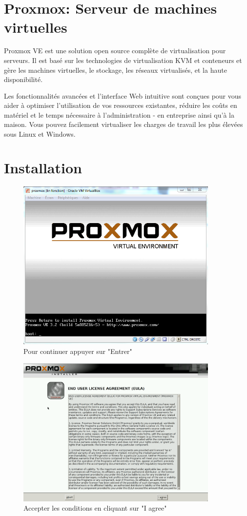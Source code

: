 \documentclass[12pt,a4paper]{article}
\begin{document}
\newpage
\section{Proxmox: Serveur de machines virtuelles}

Proxmox VE est une solution open source complète de virtualisation pour serveurs. Il est basé sur les technologies de virtualisation KVM et conteneurs et gère les machines virtuelles, le stockage, les réseaux virtualisés, et la haute disponibilité.

Les fonctionnalités avancées et l'interface Web intuitive sont conçues pour vous aider à optimiser l'utilisation de vos ressources existantes, réduire les coûts en matériel et le temps nécessaire à l'administration - en entreprise ainsi qu'à la maison. Vous pouvez facilement virtualiser les charges de travail les plus élevées sous Linux et Windows.
\newpage
\section{Installation}

\begin{figure}[!ht]
\center
\includegraphics[width=10cm]{Images/1.PNG} 
\caption{Pour continuer appuyer sur "Entrer"}
\end{figure}


\begin{figure}[!ht]
\center
\includegraphics[width=10cm]{Images/2.PNG} 
\caption{Accepter les conditions en cliquant sur "I agree"}
\end{figure}
\end{document}
